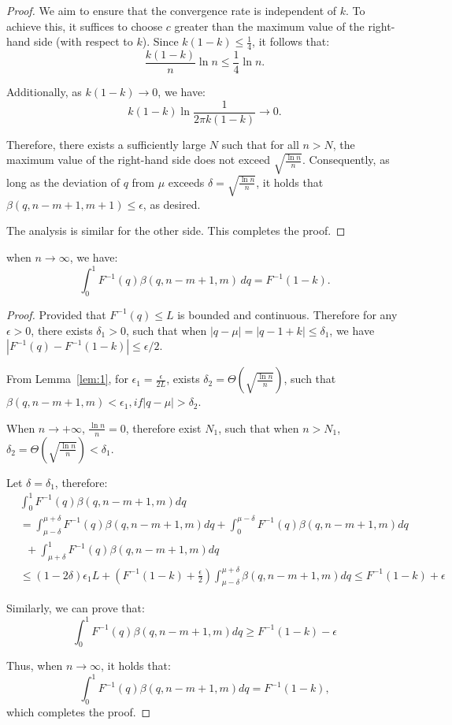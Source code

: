 \begin{proof}
We aim to ensure that the convergence rate is independent of \( k \). To achieve this, it suffices to choose \( c \) greater than the maximum value of the right-hand side (with respect to \( k \)). Since \( k(1-k) \leq \frac{1}{4} \), it follows that:
\[
\frac{k(1-k)}{n} \ln n \leq \frac{1}{4} \ln n.
\]

Additionally, as \( k(1-k) \to 0 \), we have: 
\[
k(1-k) \ln \frac{1}{2\pi k(1-k)} \to 0.
\]

Therefore, there exists a sufficiently large \( N \) such that for all \( n > N \), the maximum value of the right-hand side does not exceed \( \sqrt{\frac{\ln n}{n}} \). Consequently, as long as the deviation of \( q \) from \( \mu \) exceeds \( \delta = \sqrt{\frac{\ln n}{n}} \), it holds that \( \beta(q, n-m+1, m+1) \leq \epsilon \), as desired.

The analysis is similar for the other side. This completes the proof.
\end{proof}

\begin{lemma}\label{lem:2}
    when $n \rightarrow \infty$, we have:
    $$\int_0^1F^{-1}(q)\beta(q,n-m+1,m)\,dq = F^{-1}(1-k).$$
\end{lemma}
\begin{proof}
    Provided that $F^{-1}(q)\le L$ is bounded and continuous. Therefore for any $\epsilon>0$, there exists $\delta_1>0$, such that when $|q-\mu|=|q-1+k|\le \delta_1$, we have $|F^{-1}(q)-F^{-1}(1-k)|\le \epsilon /2$.

    From Lemma~\ref{lem:1}, for $\epsilon_1=\frac{\epsilon}{2L}$, exists $\delta_2=\Theta(\sqrt{\frac{\ln n}{n}})$, such that $\beta(q,n-m+1,m)<\epsilon_1, if |q-\mu|> \delta_2$.

When $n\rightarrow +\infty$, $\frac{\ln n}{n}=0$, therefore exist $N_1$, such that when $n>N_1$, $\delta_2=\Theta(\sqrt{\frac{\ln n}{n}})<\delta_1$. 

Let $\delta=\delta_1$, therefore:
$$
\begin{aligned}
& \int_0^1F^{-1}(q)\beta(q,n-m+1,m)dq \\ &=\int_{\mu-\delta}^{\mu+\delta}F^{-1}(q)\beta(q,n-m+1,m)dq+ \int_0^{\mu-\delta}F^{-1}(q)\beta(q,n-m+1,m)dq \\ & \phantom{a}+\int_{\mu+\delta}^1F^{-1}(q)\beta(q,n-m+1,m)dq  \\ &\le (1-2\delta)\epsilon_1L+ (F^{-1}(1-k)+\frac{\epsilon}{2})\int_{\mu-\delta}^{\mu+\delta}\beta(q,n-m+1,m)dq \le F^{-1}(1-k)+\epsilon    
\end{aligned}
$$

Similarly, we can prove that:
$$\int_0^1F^{-1}(q)\beta(q,n-m+1,m)dq \ge F^{-1}(1-k)-\epsilon $$

Thus, when $n\rightarrow \infty$, it holds that:
$$\int_0^1F^{-1}(q)\beta(q,n-m+1,m)dq = F^{-1}(1-k),$$
which completes the proof.
\end{proof}

